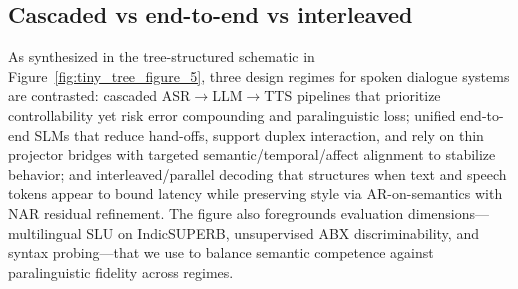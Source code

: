\documentclass{article}
\begin{document}
\subsection{Cascaded vs end-to-end vs interleaved} \label{subsec:cascadedvsend-to-endvsinterleaved}
As synthesized in the tree-structured schematic in Figure~\ref{fig:tiny_tree_figure_5}, three design regimes for spoken dialogue systems are contrasted: cascaded ASR$\rightarrow$LLM$\rightarrow$TTS pipelines that prioritize controllability yet risk error compounding and paralinguistic loss; unified end-to-end SLMs that reduce hand-offs, support duplex interaction, and rely on thin projector bridges with targeted semantic/temporal/affect alignment to stabilize behavior; and interleaved/parallel decoding that structures when text and speech tokens appear to bound latency while preserving style via AR-on-semantics with NAR residual refinement. The figure also foregrounds evaluation dimensions---multilingual SLU on IndicSUPERB, unsupervised ABX discriminability, and syntax probing---that we use to balance semantic competence against paralinguistic fidelity across regimes.
\end{document}
